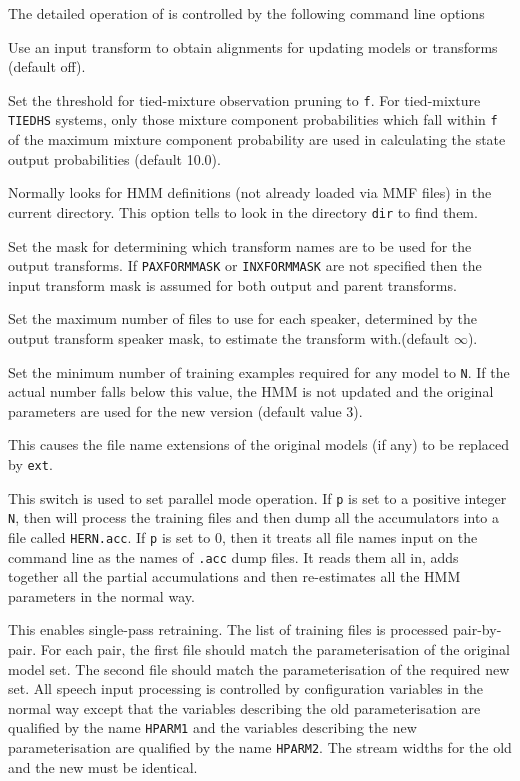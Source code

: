 The detailed operation of  is controlled by the following
command line options
\begin{optlist}

   Use an input transform to obtain alignments for updating
      models or transforms (default off).
 
   Set the threshold for tied-mixture observation
      pruning to {\tt f}.
      For tied-mixture \texttt{TIEDHS} systems, only those 
      mixture component probabilities which fall within {\tt f} of
      the maximum mixture component probability are used in calculating
      the state output probabilities (default 10.0).
 
      Normally  looks for HMM definitions
       (not already loaded via MMF files) 
      in the current directory.  This option tells  to look in
      the directory {\tt dir} to find them.

   Set the mask for determining which transform names are 
	to be used for the output transforms. If \texttt{PAXFORMMASK}
       	or \texttt{INXFORMMASK} are not specified then the input
  	transform mask is assumed for both output and parent transforms.

   Set the maximum number of files to use for each 
	speaker, determined by the output transform speaker mask,
	to estimate the transform with.(default $\infty$).

    Set the minimum number of training examples 
    required for any model to {\tt N}.  If the actual number
    falls below this value, the HMM is not updated and the original
    parameters are used for the new version (default value 3).

    This causes the file name extensions of the
      original models (if any) to be replaced by {\tt ext}.

    This switch is used to set parallel mode operation.
      If {\tt p} is set to a positive integer {\tt N}, then  will
      process the training files and then dump all the accumulators
      into a file called {\tt HERN.acc}.  If {\tt p} is set to 0, then
      it treats all file names input on the command line as the names
      of {\tt .acc} dump files.  It reads them all in, adds together
      all the partial accumulations and then re-estimates all the
      HMM parameters in the normal way. 

    This enables single-pass retraining.  The list of training
      files is processed pair-by-pair.  For each pair, the first file
      should match the parameterisation of the original model set.  The
      second file should match the parameterisation of the required new
      set.  All speech input processing is controlled by configuration
      variables in the normal way except that the variables describing
      the old parameterisation are qualified by the name \texttt{HPARM1}
      and the variables describing the new parameterisation are
      qualified by the name \texttt{HPARM2}.  The stream widths for the
      old and the new must be identical.


\end{optlist}
